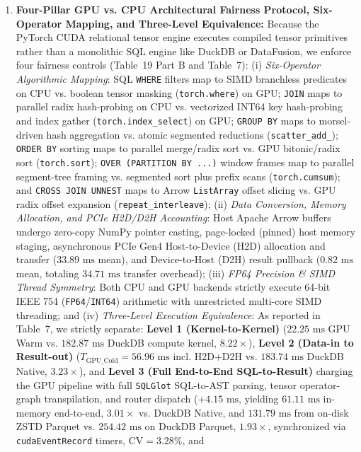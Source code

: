 \documentclass[10pt,a4paper]{article}
\begin{document}
\begin{enumerate}[leftmargin=1.5em,itemsep=2pt]
significantly with multi-engine query execution complexity---including distributed cloud slot compute time on BigQuery ($\rho = 0.5124, p = 2.41\times 10^{-6}$), Apache DataFusion CPU latency ($\rho = 0.3839, p = 0.0007$), and Polars latency ($\rho = 0.3137, p = 0.0061$)---and on the external 22-query TPC-H suite (Q1--Q22) exhibits strong alignment with AST node complexity ($\rho = 0.8418, p = 9.12\times 10^{-7}$) and a partial correlation of $\rho_{\text{partial}} = 0.5840$ ($p = 0.0054$) with join/subquery execution work controlling for scanned table volume.
    \item \textbf{Four-Pillar GPU vs. CPU Architectural Fairness Protocol, Six-Operator Mapping, and Three-Level Equivalence:} Because the PyTorch CUDA relational tensor engine executes compiled tensor primitives rather than a monolithic SQL engine like DuckDB or DataFusion, we enforce four fairness controls (Table~19 Part B and Table~7): (i) \emph{Six-Operator Algorithmic Mapping}: SQL \texttt{WHERE} filters map to SIMD branchless predicates on CPU vs. boolean tensor masking (\texttt{torch.where}) on GPU; \texttt{JOIN} maps to parallel radix hash-probing on CPU vs. vectorized INT64 key hash-probing and index gather (\texttt{torch.index\_\allowbreak{}select}) on GPU; \texttt{GROUP BY} maps to morsel-driven hash aggregation vs. atomic segmented reductions (\texttt{scatter\_\allowbreak{}add\_\allowbreak{}}); \texttt{ORDER BY} sorting maps to parallel merge/radix sort vs. GPU bitonic/radix sort (\texttt{torch.sort}); \texttt{OVER (PARTITION BY ...)} window frames map to parallel segment-tree framing vs. segmented sort plus prefix scans (\texttt{torch.cumsum}); and \texttt{CROSS JOIN UNNEST} maps to Arrow \texttt{ListArray} offset slicing vs. GPU radix offset expansion (\texttt{repeat\_\allowbreak{}interleave}); (ii) \emph{Data Conversion, Memory Allocation, and PCIe H2D/D2H Accounting}: Host Apache Arrow buffers undergo zero-copy NumPy pointer casting, page-locked (pinned) host memory staging, asynchronous PCIe Gen4 Host-to-Device (H2D) allocation and transfer ($33.89\text{ ms}$ mean), and Device-to-Host (D2H) result pullback ($0.82\text{ ms}$ mean, totaling $34.71\text{ ms}$ transfer overhead); (iii) \emph{FP64 Precision \& SIMD Thread Symmetry}: Both CPU and GPU backends strictly execute 64-bit IEEE 754 (\texttt{FP64}/\texttt{INT64}) arithmetic with unrestricted multi-core SIMD threading; and (iv) \emph{Three-Level Execution Equivalence}: As reported in Table~7, we strictly separate: \textbf{Level 1 (Kernel-to-Kernel)} ($22.25\text{ ms}$ GPU Warm vs. $182.87\text{ ms}$ DuckDB compute kernel, $8.22\times$), \textbf{Level 2 (Data-in to Result-out)} ($T_{\text{GPU\_Cold}} = 56.96\text{ ms}$ incl. H2D+D2H vs. $183.74\text{ ms}$ DuckDB Native, $3.23\times$), and \textbf{Level 3 (Full End-to-End SQL-to-Result)} charging the GPU pipeline with full \texttt{SQLGlot} SQL-to-AST parsing, tensor operator-graph transpilation, and router dispatch ($+4.15\text{ ms}$, yielding $61.11\text{ ms}$ in-memory end-to-end, $3.01\times$ vs. DuckDB Native, and $131.79\text{ ms}$ from on-disk ZSTD Parquet vs. $254.42\text{ ms}$ on DuckDB Parquet, $1.93\times$, synchronized via \texttt{cudaEventRecord} timers, $\text{CV}=3.28\%$, and 
\end{enumerate}
\end{document}

